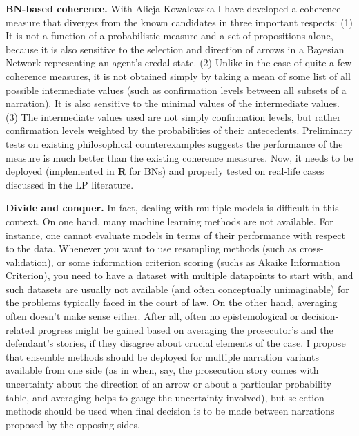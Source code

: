 \documentclass[11pt,dvipsnames,enabledeprecatedfontcommands]{scrartcl}
\begin{document}
\noindent
 \textbf{BN-based coherence.} With Alicja Kowalewska I have developed a
coherence measure that diverges from the known candidates in three
important respects: (1) It is not a function of a probabilistic measure
and a set of propositions alone, because it is also sensitive to the
selection and direction of arrows in a Bayesian Network representing an
agent's credal state. (2) Unlike in the case of quite a few coherence
measures, it is not obtained simply by taking a mean of some list of all
possible intermediate values (such as confirmation levels between all
subsets of a narration). It is also sensitive to the minimal values of
the intermediate values. (3) The intermediate values used are not simply
confirmation levels, but rather confirmation levels weighted by the
probabilities of their antecedents. Preliminary tests on existing
philosophical counterexamples suggests the performance of the measure is
much better than the existing coherence measures. Now, it needs to be
deployed (implemented in \textbf{\textsf{R}} for BNs) and properly
tested on real-life cases discussed in the LP literature.

\noindent
 \textbf{Divide and conquer.} In fact, dealing with multiple models is
difficult in this context. On one hand, many machine learning methods
are not available. For instance, one cannot evaluate models in terms of
their performance with respect to the data. Whenever you want to use
resampling methods (such as cross-validation), or some information
criterion scoring (suchs as Akaike Information Criterion), you need to
have a dataset with multiple datapoints to start with, and such datasets
are usually not available (and often conceptually unimaginable) for the
problems typically faced in the court of law. On the other hand,
averaging often doesn't make sense either. After all, often no
epistemological or decision-related progress might be gained based on
averaging the prosecutor's and the defendant's stories, if they disagree
about crucial elements of the case. I propose that ensemble methods
should be deployed for multiple narration variants available from one
side (as in when, say, the prosecution story comes with uncertainty
about the direction of an arrow or about a particular probability table,
and averaging helps to gauge the uncertainty involved), but selection
methods should be used when final decision is to be made between
narrations proposed by the opposing sides.
\end{document}
